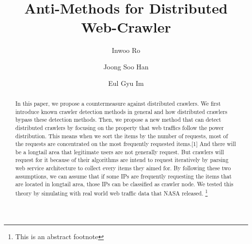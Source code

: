 \documentclass[sigconf,anonymous=false]{acmart}
\begin{document}
\title{Anti-Methods for Distributed Web-Crawler}

\author{Inwoo Ro}

\author{Joong Soo Han}

\author{Eul Gyu Im}



\begin{abstract}
In this paper, we propose a countermeasure against distributed crawlers. We first introduce known crawler detection methods in general and how distributed crawlers bypass these detection methods. Then, we propose a new method that can detect distributed crawlers by focusing on the property that web traffics follow the power distribution. This means when we sort the items by the number of requests, most of the requests are concentrated on the most frequently requested items.[1] And there will be a longtail area that legitimate users are not generally request. But crawlers will request for it because of their algorithms are intend to request iteratively by parsing web service architecture to collect every items they aimed for. By following these two assumptions, we can assume that if some IPs are frequently requesting the items that are located in longtail area, those IPs can be classified as crawler node. We tested this theory by simulating with real world web traffic data that NASA released. \footnote{This is an abstract footnote}
\end{abstract}


\end{document}

